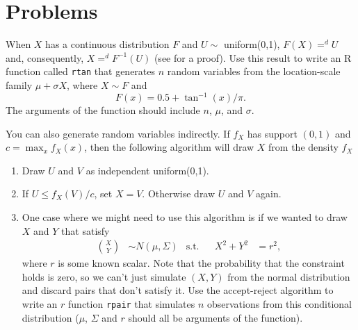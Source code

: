 

\chapter{Problems}

\begin{hw}
  When $X$ has a continuous distribution $F$ and $U \sim$
  uniform(0,1), $F(X) =^d U$ and, consequently, $X =^d F^{-1}(U)$ (see
  \citealt[Theorem 2.1.10]{CB02} for a proof). Use this result to
  write an R function called \texttt{rtan} that generates $n$ random
  variables from the location-scale family $\mu + \sigma X$, where $X
  \sim F$ and
  \begin{equation*}
    F(x) = 0.5 + \tan^{-1}(x)/\pi.
  \end{equation*}
  The arguments of the function should include $n$, $\mu$, and $\sigma$.
\end{hw}

\begin{hw}
  You can also generate random variables indirectly. If $f_X$ has
  support $(0,1)$ and $c = \max_x f_X(x)$, then the following
  algorithm will draw $X$ from the density $f_X$ \citep[see][Section
  5.6.2]{CB02}
  \begin{enumerate}
  \item Draw $U$ and $V$ as independent uniform(0,1).
  \item If $U \leq f_X(V) / c$, set $X = V$. Otherwise draw $U$ and $V$
    again.
  \item One case where we might need to use this algorithm is if we
    wanted to draw $X$ and $Y$ that satisfy
    \begin{align*}
      \binom{X}{Y} &\sim N(\mu,\Sigma) & \text{s.t.}&& X^2 + Y^2 &= r^2,
    \end{align*}
    where $r$ is some known scalar. Note that the probability that
    the constraint holds is zero, so we can't just simulate $(X,Y)$
    from the normal distribution and discard pairs that don't satisfy
    it. Use the accept-reject algorithm to write an $r$ function
    \texttt{rpair} that simulates $n$ observations from this
    conditional distribution ($\mu$, $\Sigma$ and $r$ should all be arguments
    of the function).
  \end{enumerate}
\end{hw}

